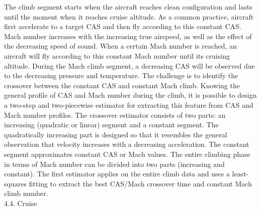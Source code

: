 \documentclass[a4paper,punct,space,heading=true,AutoFakeBold]{ctexrep}
\begin{document}
The climb segment starts when the aircraft reaches clean configuration and lasts until the moment when it reaches cruise altitude. As a common practice, aircraft first accelerate to a target CAS and then fly according to this constant CAS. Mach number increases with the increasing true airspeed, as well as the effect of the decreasing speed of sound. When a certain Mach number is reached, an aircraft will fly according to this constant Mach number until its cruising altitude. During the Mach climb segment, a decreasing CAS will be observed due to the decreasing pressure and temperature.
The challenge is to identify the crossover between the constant CAS and constant Mach climb. Knowing the general profile of CAS and Mach number during the climb, it is possible to design a two-step and two-piecewise estimator for extracting this feature from CAS and Mach number profiles.
The crossover estimator consists of two parts: an increasing (quadratic or linear) segment and a constant segment. The quadratically increasing part is designed so that it resembles the general observation that velocity increases with a decreasing acceleration. The constant segment approximates constant CAS or Mach values.
The entire climbing phase in terms of Mach number can be divided into two parts (increasing and constant). The first estimator applies on the entire climb data and uses a least-squares fitting to extract the best CAS/Mach crossover time and constant Mach climb number.\\
4.4. Cruise
\end{document}
